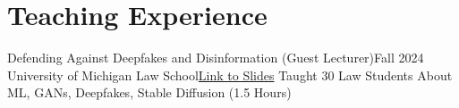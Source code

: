 \section{Teaching Experience}
  \CVSubHeadingListStart
    \CVSubheadingLong
      {Defending Against Deepfakes and Disinformation (Guest Lecturer)}{Fall 2024}
      {University of Michigan Law School}{\href{https://drive.google.com/drive/u/0/folders/1ERCBxNYdi3yjnO0RkuWOw-yk21fLrxiK}{Link to Slides}}
      {Taught 30 Law Students About ML, GANs, Deepfakes, Stable Diffusion (1.5 Hours)}{}
  \CVSubHeadingListEnd